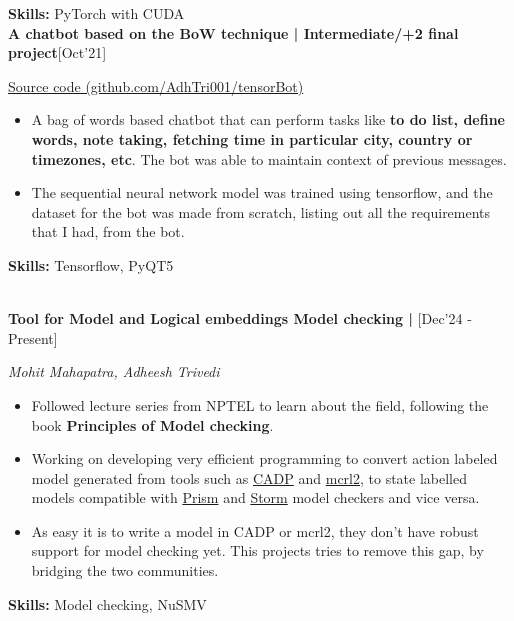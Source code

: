 \textbf{Skills:} PyTorch with CUDA\\


\textbf{A chatbot based on the BoW technique | Intermediate/+2 final project}\hfill {[Oct'21]}

\hfill \href{https://github.com/AdhTri001/tensorBot}
    {Source code (github.com/AdhTri001/tensorBot)}

\begin{itemize}
    \item A bag of words based chatbot that can perform tasks like
    \textbf{to do list, define words, note taking, fetching time
    in particular city, country or timezones, etc}.
    The bot was able to maintain context of previous messages.

    \item The sequential neural network model was trained using tensorflow,
    and the dataset for the bot was made from scratch, listing out all the
    requirements that I had, from the bot.
\end{itemize}

\textbf{Skills:} Tensorflow, PyQT5


\newpage
{}
\\


\textbf{Tool for Model and Logical embeddings Model checking | \arpits}\hfill {[Dec’24 - Present]}

\textit{Mohit Mahapatra, Adheesh Trivedi}

\begin{itemize}
    \item Followed lecture series from NPTEL to learn about the field,
    following the book \textbf{Principles of Model checking}.
    \item Working on developing very efficient programming to convert
    action labeled model generated from tools such as \href{https://cadp.inria.fr/}{CADP}
    and \href{https://www.mcrl2.org/web/index.html}{mcrl2}, to state labelled
    models compatible with \href{https://prismmodelchecker.org/}{Prism} and
    \href{https://www.stormchecker.org/}{Storm} model checkers and vice versa.
    \item As easy it is to write a model in CADP or mcrl2,
    they don't have robust support for model checking yet.
    This projects tries to remove this gap, by bridging the
    two communities.
\end{itemize}

\textbf{Skills:} Model checking, NuSMV
\\


